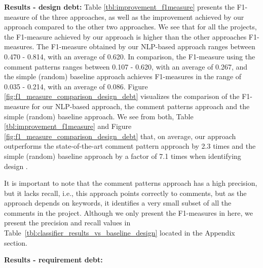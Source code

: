 \vspace{1mm}

\noindent \textbf{Results - design debt:} Table \ref{tbl:improvement_f1measure} presents the F1-measure of the three approaches, as well as the improvement achieved by our approach compared to the other two approaches. We see that for all the projects, the F1-measure achieved by our approach is higher than the other approaches F1-measures. The F1-measure obtained by our NLP-based approach ranges between 0.470 - 0.814, with an average of 0.620. In comparison, the F1-measure using the comment patterns ranges between 0.107 - 0.620, with an average of 0.267, and the simple (random) baseline approach achieves F1-measures in the range of 0.035 - 0.214, with an average of 0.086. Figure \ref{fig:f1_measure_comparison_design_debt} visualizes the comparison of the F1-measure for our NLP-based approach, the comment patterns approach and the simple (random) baseline approach. We see from both, Table \ref{tbl:improvement_f1measure} and Figure \ref{fig:f1_measure_comparison_design_debt} that, on average, our approach outperforms the state-of-the-art comment pattern approach by 2.3 times and the simple (random) baseline approach by a factor of 7.1 times when identifying design \SATD.

It is important to note that the comment patterns approach has a high precision, but it lacks recall, i.e., this approach points correctly to \SATD comments, but as the approach depends on keywords, it identifies a very small subset of all the \SATD comments in the project. Although we only present the F1-measures in here, we present the precision and recall values in Table~\ref{tbl:classifier_results_vs_baseline_design} located in the Appendix section.  

\noindent \textbf{Results - requirement debt:}  
 
